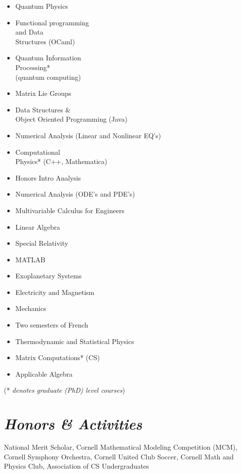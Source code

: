 {\begin{resume}
\begin{multicols}{3}
\begin{itemize}
\item{Quantum Physics}
\item{Functional programming\\
and Data\\
Structures (OCaml)}
\item{Quantum Information\\
Processing*\\
(quantum computing)}
\item{Matrix Lie Groups}
\item{Data Structures \&\\
Object Oriented Programming (Java)}
\item{Numerical Analysis (Linear and Nonlinear EQ's)}
\item{Computational\\
Physics* (C++, Mathematica)}
\item{Honors Intro Analysis}
\item{Numerical Analysis (ODE's and PDE's)}
\item{Multivariable Calculus for Engineers}
\item{Linear Algebra}
\item{Special Relativity}
\item{MATLAB}
\item{Exoplanetary Systems}
\item{Electricity and Magnetism}
\item{Mechanics}
\item{Two semesters of French}
\item{Thermodynamic and Statistical Physics}
\item{Matrix Computations* (CS)}
\item{Applicable Algebra}

\end{itemize}
\end{multicols}
\begin{center}
(* \textit{denotes graduate (PhD) level courses})
\end{center}
\section{\sl\bf  Honors \& Activities}
\begin{ncolumn}{1}
National Merit Scholar, Cornell Mathematical Modeling Competition (MCM), Cornell Symphony Orchestra, Cornell United Club Soccer, Cornell Math and Physics Club, Association of CS Undergraduates
\end{ncolumn}
\end{resume}
\vfill} %




